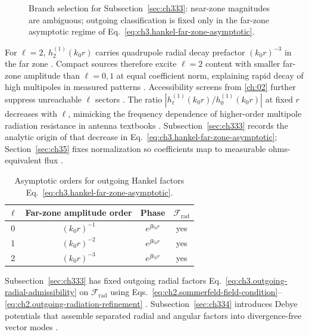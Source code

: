 \begin{figure}[t]
\centering
{}
\caption{Branch selection for Subsection~\ref{sec:ch333}: near-zone magnitudes are ambiguous; outgoing classification
is fixed only in the far-zone asymptotic regime of Eq.~\eqref{eq:ch3.hankel-far-zone-asymptotic}.}
\label{fig:ch3.near-far-radial-gate}
\end{figure}
For \(\ell=2\), \(h_{2}^{(1)}(k_{0}r)\) carries quadrupole radial decay prefactor \((k_{0}r)^{-3}\) in the far zone
. Compact sources therefore excite \(\ell=2\) content with smaller far-zone amplitude
than \(\ell=0,1\) at equal coefficient norm, explaining rapid decay of high multipoles in measured patterns
. Accessibility screens from \ref{ch:02} further suppress unreachable
\(\ell\) sectors .
The ratio \(|h_{\ell}^{(1)}(k_{0}r)/h_{0}^{(1)}(k_{0}r)|\) at fixed \(r\) decreases with \(\ell\), mimicking the
frequency dependence of higher-order multipole radiation resistance in antenna textbooks .
Subsection~\ref{sec:ch333} records the analytic origin of that decrease in
Eq.~\eqref{eq:ch3.hankel-far-zone-asymptotic}; Section~\ref{sec:ch35} fixes normalization so coefficients map to
measurable ohms-equivalent flux .
\begin{table}[t]
\centering
\caption{Asymptotic orders for outgoing Hankel factors Eq.~\eqref{eq:ch3.hankel-far-zone-asymptotic}.}
\label{tab:ch3.333-hankel-asymptotic-orders}
\small
\begin{tabular}{@{}cccc@{}}
\toprule
\(\ell\) & Far-zone amplitude order & Phase & \(\mathcal{F}_{\mathrm{rad}}\) \\
\midrule
0 & \((k_{0}r)^{-1}\) & \(e^{\jj k_{0}r}\) & yes \\
1 & \((k_{0}r)^{-2}\) & \(e^{\jj k_{0}r}\) & yes \\
2 & \((k_{0}r)^{-3}\) & \(e^{\jj k_{0}r}\) & yes \\
\bottomrule
\end{tabular}
\end{table}
Subsection~\ref{sec:ch333} has fixed outgoing radial factors
Eq.~\eqref{eq:ch3.outgoing-radial-admissibility} on \(\mathcal{F}_{\mathrm{rad}}\) using
Eqs.~\eqref{eq:ch2.sommerfeld-field-condition}--\eqref{eq:ch2.outgoing-radiation-refinement}
. Subsection~\ref{sec:ch334} introduces Debye potentials that assemble separated
radial and angular factors into divergence-free vector modes .

